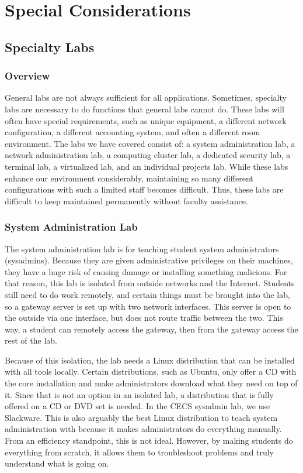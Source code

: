 \chapter{Special Considerations} \label{ch:special_considerations}
\section{Specialty Labs} \label{sec:specialty_labs}
\subsection{Overview}
General labs are not always sufficient for all applications.  Sometimes, specialty labs are necessary to do functions that general labs cannot do.  These labs will often have special requirements, such as unique equipment, a different network configuration, a different accounting system, and often a different room environment.  The labs we have covered consist of:  a system administration lab, a network administration lab, a computing cluster lab, a dedicated security lab, a terminal lab, a virtualized lab, and an individual projects lab. While these labs enhance our environment considerably, maintaining so many different configurations with such a limited staff becomes difficult. Thus, these labs are difficult to keep maintained permanently without faculty assistance.  
\subsection{System Administration Lab}
The system administration lab is for teaching student system administrators (sysadmins).  Because they are given administrative privileges on their machines, they have a huge risk of causing damage or installing something malicious.  For that reason, this lab is isolated from outside networks and the Internet.  Students still need to do work remotely, and certain things must be brought into the lab, so a gateway server is set up with two network interfaces.  This server is open to the outside via one interface, but does not route traffic between the two.  This way, a student can remotely access the gateway, then from the gateway access the rest of the lab.  

Because of this isolation, the lab needs a Linux distribution that can be installed with all tools locally.  Certain distributions, such as Ubuntu, only offer a CD with the core installation and make administrators download what they need on top of it.  Since that is not an option in an isolated lab, a distribution that is fully offered on a CD or DVD set is needed.  In the CECS sysadmin lab, we use Slackware.  This is also arguably the best Linux distribution to teach system administration with because it makes administrators do everything manually.  From an efficiency standpoint, this is not ideal.  However, by making students do everything from scratch, it allows them to troubleshoot problems and truly understand what is going on.  

